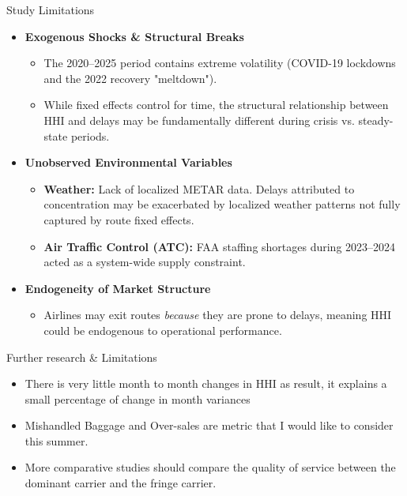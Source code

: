 \documentclass[t]{beamer}
\begin{document}
\begin{frame}{Study Limitations}
    \begin{itemize}
        \item \textbf{Exogenous Shocks \& Structural Breaks}
        \begin{itemize}
            \item The 2020--2025 period contains extreme volatility (COVID-19 lockdowns and the 2022 recovery "meltdown").
            \item While fixed effects control for time, the structural relationship between HHI and delays may be fundamentally different during crisis vs. steady-state periods.
        \end{itemize}
        \addlinespace
        \item \textbf{Unobserved Environmental Variables}
        \begin{itemize}
            \item \textbf{Weather:} Lack of localized METAR data. Delays attributed to concentration may be exacerbated by localized weather patterns not fully captured by route fixed effects.
            \item \textbf{Air Traffic Control (ATC):} FAA staffing shortages during 2023--2024 acted as a system-wide supply constraint.
        \end{itemize}
        \addlinespace
        \item \textbf{Endogeneity of Market Structure}
        \begin{itemize}
            \item Airlines may exit routes \textit{because} they are prone to delays, meaning HHI could be endogenous to operational performance.
        \end{itemize}
    \end{itemize}
\end{frame}

\begin{frame}{Further research \& Limitations} %
    \begin{itemize}
        \item There is very little month to month changes in HHI as result, it explains a small percentage of change in month variances
        \item Mishandled Baggage and Over-sales are metric that I would like to consider this summer.
        \item More comparative studies should compare the quality of service between the dominant carrier and the fringe carrier.
    \end{itemize}
\end{frame}
\end{document}
